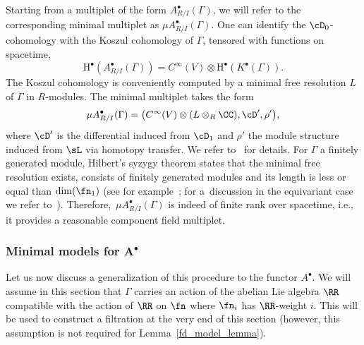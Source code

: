 Starting from a multiplet of the form $A^\bullet_{R/I}(\Gamma)$, we will refer to the corresponding minimal multiplet as $\mu A^\bullet_{R/I}(\Gamma)$.
One can identify the $\cD_0$-cohomology with the Koszul cohomology of $\Gamma$, tensored with functions on spacetime,
\begin{equation*}
\mathrm H^\bullet(A_{R/I}^\bullet(\Gamma)) = C^\infty(V) \otimes \mathrm H^\bullet(K^\bullet(\Gamma)) .
\end{equation*}
The Koszul cohomology is conveniently computed by a minimal free resolution $L$ of $\Gamma$ in $R$-modules. The minimal multiplet takes the form
\begin{equation*}
\mu A^\bullet_{R/I}(\Gamma) = \big( C^\infty(V) \otimes (L \otimes_R \CC) , \cD' ,\rho' \big) ,
\end{equation*}
where $\cD'$ is the differential induced from $\cD_1$ and $\rho'$ the module structure induced from $\sL$ via homotopy transfer. We refer to~\cite{perspectives} for details. For $\Gamma$ a finitely generated module, Hilbert's syzygy theorem states that the minimal free resolution exists, consists of finitely generated modules and its length is less or equal than $\dim(\fn_1)$ (see for example~\cite[Theorem 1.13]{MR1322960}; for a~discussion in the equivariant case we refer to~\cite[Proposition 2.4.9, Remark 2.4.10]{Galetto}). Therefore,~$\mu A_{R/I}^\bullet(\Gamma)$ is indeed of finite rank over spacetime, i.e., it provides a reasonable component field multiplet.

\subsubsection[Minimal models for A\^{}bullet]{Minimal models for $\boldsymbol{A^\bullet}$}

Let us now discuss a generalization of this procedure to the functor $A^\bullet$. We will assume in this section that $\Gamma$ carries an action of the abelian Lie algebra $\RR$ compatible with the action of $\RR$ on $\fn$ where $\fn_i$ has $\RR$-weight $i$. This will be used to construct a filtration at the very end of this section (however, this assumption is not required for Lemma~\ref{fd_model_lemma}).

